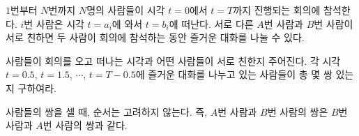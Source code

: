 $1$번부터 $N$번까지 $N$명의 사람들이 시각 $t=0$에서 $t=T$까지 진행되는 회의에 참석한다. $i$번 사람은 시각 $t=a_i$에 와서 $t=b_i$에 떠난다. 서로 다른 $A$번 사람과 $B$번 사람이 서로 친하면 두 사람이 회의에 참석하는 동안 즐거운 대화를 나눌 수 있다.

사람들이 회의를 오고 떠나는 시각과 어떤 사람들이 서로 친한지 주어진다. 각 시각 $t=0.5$, $t=1.5$, $\cdots$, $t=T-0.5$에 즐거운 대화를 나누고 있는 사람들이 총 몇 쌍 있는지 구하여라.

사람들의 쌍을 셀 때, 순서는 고려하지 않는다. 즉, $A$번 사람과 $B$번 사람의 쌍은 $B$번 사람과 $A$번 사람의 쌍과 같다.

